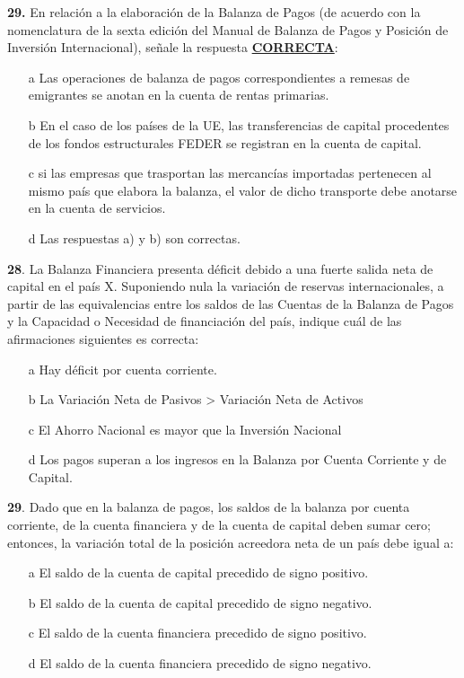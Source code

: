 \documentclass{nuevotema}
\begin{document}

\textbf{29.} En relación a la elaboración de la Balanza de Pagos (de acuerdo con la nomenclatura de la sexta edición del Manual de Balanza de Pagos y Posición de Inversión Internacional), señale la respuesta \textbf{\underline{CORRECTA}}:

\begin{itemize}
	\item[a] Las operaciones de balanza de pagos correspondientes a remesas de emigrantes se anotan en la cuenta de rentas primarias.
	\item[b] En el caso de los países de la UE, las transferencias de capital procedentes de los fondos estructurales FEDER se registran en la cuenta de capital.
	\item[c] si las empresas que trasportan las mercancías importadas pertenecen al mismo país que elabora la balanza, el valor de dicho transporte debe anotarse en la cuenta de servicios.
	\item[d] Las respuestas a) y b) son correctas.
\end{itemize}



\textbf{28}. La Balanza Financiera presenta déficit debido a una fuerte salida neta de capital en el país X. Suponiendo nula la variación de reservas internacionales, a partir de las equivalencias entre los saldos de las Cuentas de la Balanza de Pagos y la Capacidad o Necesidad de financiación del país, indique cuál de las afirmaciones siguientes es correcta:

\begin{enumerate}
	\item[a] Hay déficit por cuenta corriente.
	\item[b] La Variación Neta de Pasivos > Variación Neta de Activos
	\item[c] El Ahorro Nacional es mayor que la Inversión Nacional
	\item[d] Los pagos superan a los ingresos en la Balanza por Cuenta Corriente y de Capital.
\end{enumerate}


\textbf{29}. Dado que en la balanza de pagos, los saldos de la balanza por cuenta corriente, de la cuenta financiera y de la cuenta de capital deben sumar cero; entonces, la variación total de la posición acreedora neta de un país debe igual a:

\begin{enumerate}
    \item[a] El saldo de la cuenta de capital precedido de signo positivo.
    \item[b] El saldo de la cuenta de capital precedido de signo negativo.
    \item[c] El saldo de la cuenta financiera precedido de signo positivo.
    \item[d] El saldo de la cuenta financiera precedido de signo negativo.
\end{enumerate}
\end{document}
